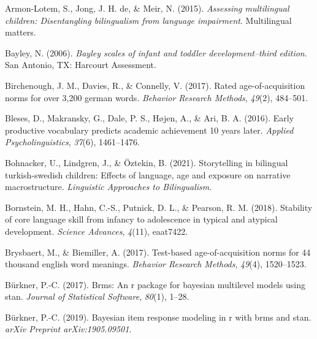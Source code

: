 \documentclass[
  man,floatsintext]{apa6}
\newlength{\cslhangindent}
\newlength{\cslentryspacingunit} %
\newenvironment{CSLReferences}[2] %
 {%
  \setlength{\parindent}{0pt}
  \ifodd #1
  \let\oldpar\par
  \def\par{\hangindent=\cslhangindent\oldpar}
  \fi
  \setlength{\parskip}{#2\cslentryspacingunit}
 }%
 {}
\begin{document}
\hypertarget{refs}{}
\begin{CSLReferences}{1}{0}
\leavevmode{}%
Armon-Lotem, S., Jong, J. H. de, \& Meir, N. (2015). \emph{Assessing multilingual children: Disentangling bilingualism from language impairment}. Multilingual matters.

\leavevmode{}%
Bayley, N. (2006). \emph{Bayley scales of infant and toddler development--third edition}. San Antonio, TX: Harcourt Assessment.

\leavevmode{}%
Birchenough, J. M., Davies, R., \& Connelly, V. (2017). Rated age-of-acquisition norms for over 3,200 german words. \emph{Behavior Research Methods}, \emph{49}(2), 484--501.

\leavevmode{}%
Bleses, D., Makransky, G., Dale, P. S., Højen, A., \& Ari, B. A. (2016). Early productive vocabulary predicts academic achievement 10 years later. \emph{Applied Psycholinguistics}, \emph{37}(6), 1461--1476.

\leavevmode{}%
Bohnacker, U., Lindgren, J., \& Öztekin, B. (2021). Storytelling in bilingual turkish-swedish children: Effects of language, age and exposure on narrative macrostructure. \emph{Linguistic Approaches to Bilingualism}.

\leavevmode{}%
Bornstein, M. H., Hahn, C.-S., Putnick, D. L., \& Pearson, R. M. (2018). Stability of core language skill from infancy to adolescence in typical and atypical development. \emph{Science Advances}, \emph{4}(11), eaat7422.

\leavevmode{}%
Brysbaert, M., \& Biemiller, A. (2017). Test-based age-of-acquisition norms for 44 thousand english word meanings. \emph{Behavior Research Methods}, \emph{49}(4), 1520--1523.

\leavevmode{}%
Bürkner, P.-C. (2017). Brms: An r package for bayesian multilevel models using stan. \emph{Journal of Statistical Software}, \emph{80}(1), 1--28.

\leavevmode{}%
Bürkner, P.-C. (2019). Bayesian item response modeling in r with brms and stan. \emph{arXiv Preprint arXiv:1905.09501}.


\end{CSLReferences}
\end{document}
